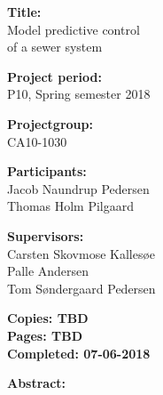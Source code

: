 \begin{minipage}[t]{0.48\textwidth}
\textbf{Title:} \\[5pt]\hspace*{2ex}
Model predictive control   \\\hspace*{2ex}
of a sewer system \\\hspace*{2ex}

\textbf{Project period:} \\[5pt]\bigskip\hspace{2ex}
P10, Spring semester 2018

\textbf{Projectgroup:} \\[5pt]\bigskip\hspace{2ex}
CA10-1030

\textbf{Participants:} \\[5pt]\hspace*{2ex}
Jacob Naundrup Pedersen \\\hspace*{2ex}
Thomas Holm Pilgaard \\\hspace*{2ex}


\textbf{Supervisors:} \\[5pt]\hspace*{2ex}
Carsten Skovmose Kallesøe \\\hspace*{2ex}
Palle Andersen \\ \hspace*{2ex} %
Tom Søndergaard Pedersen \\\hspace*{2ex}


\vspace*{3.0cm}

\textbf{Copies: TBD} \\
\textbf{Pages: TBD}\\
\textbf{Completed: 07-06-2018}\\

\end{minipage}
\hfill
\begin{minipage}[t]{0.483\textwidth}
\textbf{Abstract:} \\[5pt]
\fbox{\parbox{7cm}{\bigskip\bigskip}}
\end{minipage}

\vfill

{\footnotesize\itshape}





